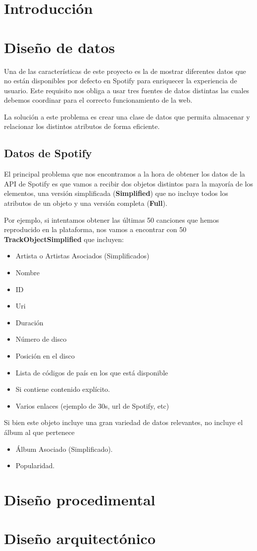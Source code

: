 
\section{Introducción}

\section{Diseño de datos}
Una de las características de este proyecto es la de mostrar diferentes datos que no están disponibles por defecto en Spotify para enriquecer la experiencia de usuario. Este requisito nos obliga a usar tres fuentes de datos distintas las cuales debemos coordinar para el correcto funcionamiento de la web. 

La solución a este problema es crear una clase de datos que permita almacenar y relacionar los distintos atributos de forma eficiente. 

\subsection{Datos de Spotify}
El principal problema que nos encontramos a la hora de obtener los datos de la API de Spotify es que vamos a recibir dos objetos distintos para la mayoría de los elementos, una versión simplificada (\textbf{Simplified}) que no incluye todos los atributos de un objeto y una versión completa (\textbf{Full}). 

Por ejemplo, si intentamos obtener las últimas 50 canciones que hemos reproducido en la plataforma, nos vamos a encontrar con 50 \textbf{TrackObjectSimplified} que incluyen:

\begin{itemize}
    \item Artista o Artistas Asociados (Simplificados)
    \item Nombre
    \item ID
    \item Uri
    \item Duración
    \item Número de disco
    \item Posición en el disco
    \item Lista de códigos de país en los que está disponible
    \item Si contiene contenido explícito.
    \item Varios enlaces (ejemplo de 30s, url de Spotify, etc)
\end{itemize}

Si bien este objeto incluye una gran variedad de datos relevantes, no incluye el álbum al que pertenece

\begin{itemize}
    \item Álbum Asociado (Simplificado).
    \item Popularidad.
\end{itemize}

\section{Diseño procedimental}

\section{Diseño arquitectónico}


